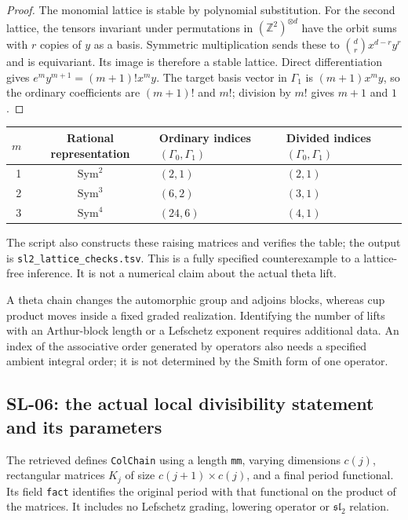 \begin{proof}
The monomial lattice is stable by polynomial substitution.  For the second
lattice, the tensors invariant under permutations in $(\mathbb Z^2)^{\otimes d}$
have the orbit sums with $r$ copies of $y$ as a basis.  Symmetric
multiplication sends these to $\binom drx^{d-r}y^r$ and is equivariant.
Its image is therefore a stable lattice.  Direct differentiation gives
$e^my^{m+1}=(m+1)!x^my$.  The target basis vector in $\Gamma_1$ is
$(m+1)x^my$, so the ordinary coefficients are $(m+1)!$ and $m!$;
division by $m!$ gives $m+1$ and $1$.
\end{proof}

\begin{center}
\begin{tabular}{rcll}
\toprule
$m$&Rational representation&Ordinary indices $(\Gamma_0,\Gamma_1)$
&Divided indices $(\Gamma_0,\Gamma_1)$\\
\midrule
1&$\operatorname{Sym}^2$&$(2,1)$&$(2,1)$\\
2&$\operatorname{Sym}^3$&$(6,2)$&$(3,1)$\\
3&$\operatorname{Sym}^4$&$(24,6)$&$(4,1)$\\
\bottomrule
\end{tabular}
\end{center}
The script also constructs these raising matrices and verifies the table;
the output is \texttt{sl2\_lattice\_checks.tsv}.  This is a fully specified
counterexample to a lattice-free inference.  It is not a numerical claim
about the actual theta lift.

A theta chain changes the automorphic group and adjoins blocks, whereas
cup product moves inside a fixed graded realization.  Identifying the
number of lifts with an Arthur-block length or a Lefschetz exponent requires
additional data.  An index of the associative order generated by operators
also needs a specified ambient integral order; it is not determined by the
Smith form of one operator.

\subsection{SL-06: the actual local divisibility statement and its parameters}
\label{sl:actual-code}

The retrieved 
defines \texttt{ColChain} using a length \texttt{mm}, varying dimensions
$c(j)$, rectangular matrices $K_j$ of size $c(j+1)\times c(j)$, and a
final period functional.  Its field \texttt{fact} identifies the original
period with that functional on the product of the matrices.  It includes
no Lefschetz grading, lowering operator or $\mathfrak{sl}_2$ relation.

